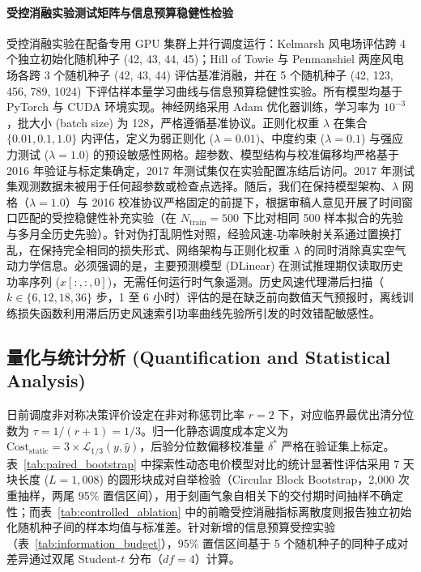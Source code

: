 \paragraph*{受控消融实验测试矩阵与信息预算稳健性检验}
受控消融实验在配备专用 GPU 集群上并行调度运行：Kelmarsh 风电场评估跨 4 个独立初始化随机种子 (42, 43, 44, 45)；Hill of Towie 与 Penmanshiel 两座风电场各跨 3 个随机种子 (42, 43, 44) 评估基准消融，并在 5 个随机种子 (42, 123, 456, 789, 1024) 下评估样本量学习曲线与信息预算稳健性实验。所有模型均基于 PyTorch 与 CUDA 环境实现。神经网络采用 Adam 优化器训练，学习率为 $10^{-3}$，批大小 (batch size) 为 128，严格遵循基准协议。正则化权重 $\lambda$ 在集合 $\{0.01, 0.1, 1.0\}$ 内评估，定义为弱正则化 ($\lambda=0.01$)、中度约束 ($\lambda=0.1$) 与强应力测试 ($\lambda=1.0$) 的预设敏感性网格。超参数、模型结构与校准偏移均严格基于 2016 年验证与标定集确定，2017 年测试集仅在实验配置冻结后访问。2017 年测试集观测数据未被用于任何超参数或检查点选择。随后，我们在保持模型架构、$\lambda$ 网格（$\lambda=1.0$）与 2016 校准协议严格固定的前提下，根据审稿人意见开展了时间窗口匹配的受控稳健性补充实验（在 $N_{\text{train}}=500$ 下比对相同 500 样本拟合的先验与多月全历史先验）。针对伪打乱阴性对照，经验风速-功率映射关系通过置换打乱，在保持完全相同的损失形式、网络架构与正则化权重 $\lambda$ 的同时消除真实空气动力学信息。必须强调的是，主要预测模型 (DLinear) 在测试推理期仅读取历史功率序列 ($x[:, :, 0]$)，无需任何运行时气象遥测。历史风速代理滞后扫描（$k \in \{6, 12, 18, 36\}$ 步，1 至 6 小时）评估的是在缺乏前向数值天气预报时，离线训练损失函数利用滞后历史风速索引功率曲线先验所引发的时效错配敏感性。

\subsection*{量化与统计分析 (Quantification and Statistical Analysis)}
日前调度非对称决策评价设定在非对称惩罚比率 $r=2$ 下，对应临界最优出清分位数为 $\tau = 1/(r+1) = 1/3$。归一化静态调度成本定义为 $\text{Cost}_{\text{static}} = 3 \times \mathcal{L}_{1/3}(y, \hat{y})$，后验分位数偏移校准量 $\delta^*$ 严格在验证集上标定。表~\ref{tab:paired_bootstrap} 中探索性动态电价模型对比的统计显著性评估采用 7 天块长度 ($L=1{,}008$) 的圆形块成对自举检验（Circular Block Bootstrap，2,000 次重抽样，两尾 95\% 置信区间），用于刻画气象自相关下的交付期时间抽样不确定性；而表~\ref{tab:controlled_ablation} 中的前瞻受控消融指标离散度则报告独立初始化随机种子间的样本均值与标准差。针对新增的信息预算受控实验（表~\ref{tab:information_budget}），95\% 置信区间基于 5 个随机种子的同种子成对差异通过双尾 Student-$t$ 分布（$df=4$）计算。
